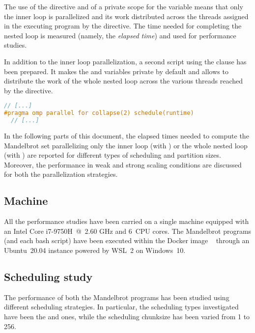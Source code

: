 \noindent
The use of the  directive and of a private scope for the  variable means that only the inner loop is parallelized and its work distributed across the threads assigned in the executing program by the  directive. The time needed for completing the nested loop is measured (namely, the \emph{elapsed time}) and used for performance studies.

In addition to the inner loop parallelization, a second script using the  clause has been prepared. It makes the  and  variables private by default and allows to distribute the work of the whole nested loop across the various threads reached by the  directive.

\begin{lstlisting}[language=C]
  // [...]
#pragma omp parallel for collapse(2) schedule(runtime)
  // [...]
\end{lstlisting}

\noindent
In the following parts of this document, the elapsed times needed to compute the Mandelbrot set parallelizing only the inner loop (with ) or the whole nested loop (with ) are reported for different types of scheduling and partition sizes. Moreover, the performance in weak and strong scaling conditions are discussed for both the parallelization strategies.

\subsection{Machine}\label{sec:machine}
All the performance studies have been carried on a single machine equipped with an Intel Core i7-9750H~@~2.60 GHz and 6~CPU cores. The Mandelbrot programs (and each bash script) have been executed within the Docker image ~\cite{classroom} through an Ubuntu~20.04 instance powered by WSL~2 \cite{wsl} on Windows~10.

\subsection{Scheduling study}\label{sec:method-sched}
The performance of both the Mandelbrot programs has been studied using different scheduling strategies. In particular, the scheduling types investigated have been the  and  ones, while the scheduling chunksize has been varied from 1 to 256.  

